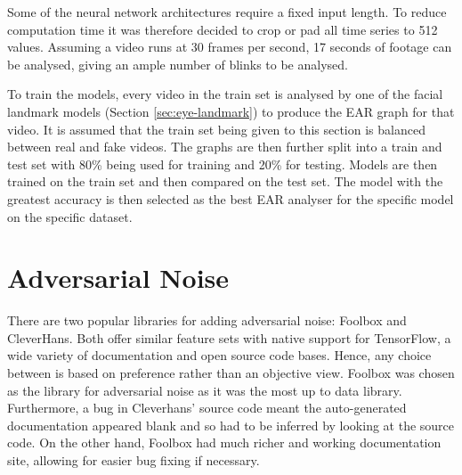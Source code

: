 Some of the neural network architectures require a fixed input length. To reduce computation time it was therefore decided to crop or pad all time series to 512 values. Assuming a video runs at 30 frames per second, 17 seconds of footage can be analysed, giving an ample number of blinks to be analysed.

To train the models, every video in the train set is analysed by one of the facial landmark models (Section \ref{sec:eye-landmark}) to produce the EAR graph for that video. It is assumed that the train set being given to this section is balanced between real and fake videos. The graphs are then further split into a train and test set with 80\% being used for training and 20\% for testing. Models are then trained on the train set and then compared on the test set. The model with the greatest accuracy is then selected as the best EAR analyser for the specific model on the specific dataset.

\section{Adversarial Noise}
\label{sec:ad-noise}


There are two popular libraries for adding adversarial noise: Foolbox\cite{rauber2017foolbox}\cite{rauber2017foolboxnative} and CleverHans\cite{papernot2018cleverhans}. Both offer similar feature sets with native support for TensorFlow, a wide variety of documentation and open source code bases. Hence, any choice between is based on preference rather than an objective view. Foolbox was chosen as the library for adversarial noise as it was the most up to data library. Furthermore, a bug in Cleverhans' source code meant the auto-generated documentation appeared blank and so had to be inferred by looking at the source code. On the other hand, Foolbox had much richer and working documentation site, allowing for easier bug fixing if necessary.

